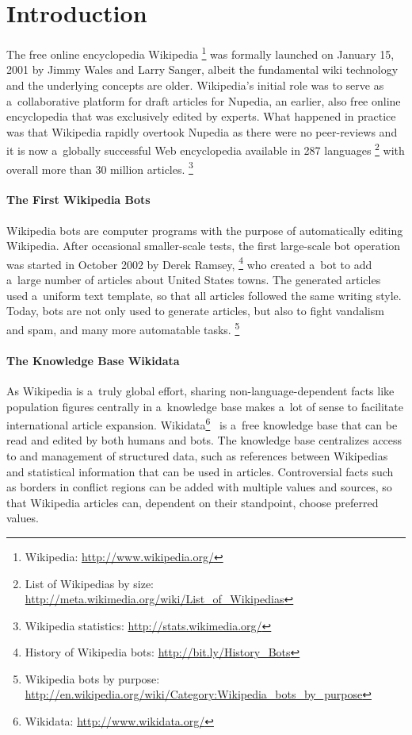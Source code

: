 \documentclass{sig-alternate}
\newcommand{\inlinelistingsize}{\fontsize{8pt}{11pt}}
\let\oldurl\url
\renewcommand{\url}[1]{\inlinelistingsize\oldurl{#1}}
\begin{document}
\section{Introduction}

The free online encyclopedia Wikipedia%
\footnote{Wikipedia: \url{http://www.wikipedia.org/}}
was formally launched on January 15, 2001
by Jimmy Wales and Larry Sanger,
albeit the fundamental wiki technology and the underlying concepts are older.
Wikipedia's initial role was to serve
as a~collaborative platform for draft articles for Nupedia,
an earlier, also free online encyclopedia that was exclusively edited by experts.
What happened in practice was that Wikipedia rapidly overtook Nupedia
as there were no peer-reviews
and it is now a~globally successful Web encyclopedia
available in 287 languages%
\footnote{List of Wikipedias by size:
\url{http://meta.wikimedia.org/wiki/List_of_Wikipedias}}
with overall more than 30 million articles.%
\footnote{Wikipedia statistics: \url{http://stats.wikimedia.org/}}

\paragraph{The First Wikipedia Bots}

Wikipedia bots are computer programs
with the purpose of automatically editing Wikipedia.
After occasional smaller-scale tests,
the first large-scale bot operation
was started in October 2002 by Derek Ramsey,%
\footnote{History of Wikipedia bots:
\url{http://bit.ly/History_Bots}}
who created a~bot to add a~large number
of articles about United States towns.
The generated articles used a~uniform
text template, so that all articles
followed the same writing style.
Today, bots are not only used to generate articles,
but also to fight vandalism and spam,
and many more automatable tasks.%
\footnote{Wikipedia bots by purpose: \url{http://en.wikipedia.org/wiki/Category:Wikipedia_bots_by_purpose}}

\paragraph{The Knowledge Base Wikidata}

As Wikipedia is a~truly global effort,
sharing non-language-dependent facts
like population figures centrally
in a~know\-ledge base makes a~lot of sense
to facilitate international article expansion.
Wikidata\footnote{Wikidata: \url{http://www.wikidata.org/}}~\cite{vrandecic2012wikidata}
is a~free knowledge base that can be read
and edited by both humans and bots.
The knowledge base centralizes access to
and management of structured data,
such as references between Wikipedias
and statistical information that can be used in articles.
Controversial facts such as borders in conflict regions
can be added with multiple values and sources,
so that Wikipedia articles can,
dependent on their standpoint, choose preferred values.
\end{document}
